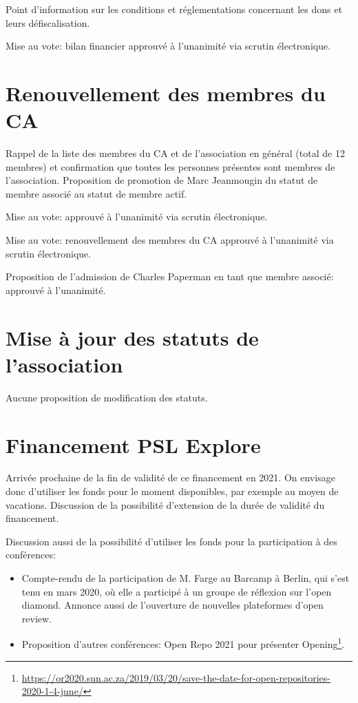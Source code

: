 \documentclass[a4paper]{article}
\begin{document}
Point d'information sur les conditions et réglementations concernant les dons et leurs défiscalisation. 

Mise au vote: bilan financier approuvé à l'unanimité via scrutin électronique.

\section{Renouvellement des membres du CA}
    Rappel de la liste des membres du CA et de l'association en général (total de 12 membres) et confirmation que toutes les personnes présentes sont membres de l'association.
    Proposition de promotion de Marc Jeanmougin du statut de membre associé au statut de membre actif.
    
    Mise au vote: approuvé à l'unanimité via scrutin électronique.
    
    Mise au vote: renouvellement des membres du CA approuvé à l'unanimité via scrutin électronique.
    
    Proposition de l'admission de Charles Paperman en tant que membre associé: approuvé à l'unanimité. 


\section{Mise à jour des statuts de l'association}
Aucune proposition de modification des statuts. 

\section{Financement PSL Explore}
Arrivée prochaine de la fin de validité de ce financement en 2021. On envisage donc d'utiliser les fonds pour le moment disponibles, par exemple au moyen de vacations. Discussion de la possibilité d'extension de la durée de validité du financement. 

Discussion aussi de la possibilité d'utiliser les fonds pour la participation à des conférences: 
\begin{itemize}
\item Compte-rendu de la participation de M. Farge au Barcamp à Berlin, qui s'est tenu en mars 2020, où elle a participé à un groupe de réflexion sur l'open diamond. Annonce aussi de l'ouverture de nouvelles plateformes d'open review. 
\item Proposition d'autres conférences: Open Repo 2021 pour présenter
Opening\footnote{\tiny \url{https://or2020.sun.ac.za/2019/03/20/save-the-date-for-open-repositories-2020-1-4-june/}}. \end{itemize}
\end{document}
